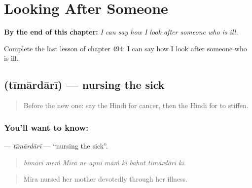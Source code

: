 
\chapter{Looking After Someone}
\label{ch:hi-looking-after-someone}

\begin{chapteropening}
\textbf{By the end of this chapter:} \emph{I can say how I look after someone who is ill.}

Complete the last lesson of chapter 494: I can say how I look after someone who is ill.
\end{chapteropening}

\section[\texorpdfstring{\hi{तीमारदारी} (tīmārdārī)}{तीमारदारी (tīmārdārī)}]{ (tīmārdārī) — nursing the sick}

\label{lesson:HI-C494-timardari}



\begin{quote}
Before the new one: say the Hindi for cancer, then the Hindi for to stiffen.
\end{quote}

\subsection*{You'll want to know: }
\textbf{} — \emph{tīmārdārī} — \textquotedblleft{}nursing the sick\textquotedblright{}.

\begin{quote}
         
\end{quote}

\begin{quote}
\emph{bīmārī meṁ Mīrā ne apnī māṁ kī bahut tīmārdārī kī.}
\end{quote}

\begin{quote}
Mira nursed her mother devotedly through her illness.
\end{quote}

